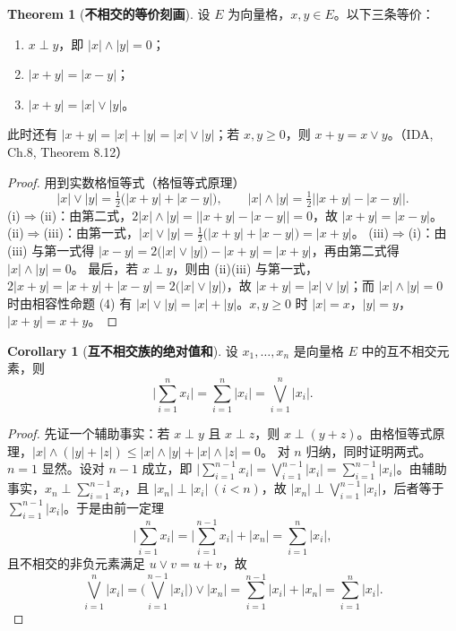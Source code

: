 \documentclass[oneside]{book}
\theoremstyle{definition}
\theoremstyle{definition}
\newtheorem{theorem}{Theorem}[section]
\newtheorem{corollary}{Corollary}[section]
\begin{document}
	\begin{theorem}[\bfseries{不相交的等价刻画}]
		设 $E$ 为向量格，$x,y\in E$。以下三条等价：
		\begin{enumerate}[label=(\roman*),leftmargin=2.2em,itemsep=0.1em,topsep=0.3em]
			\item $x\perp y$，即 $|x|\wedge|y|=0$；
			\item $|x+y|=|x-y|$；
			\item $|x+y|=|x|\vee|y|$。
		\end{enumerate}
		此时还有 $|x+y|=|x|+|y|=|x|\vee|y|$；若 $x,y\geqslant0$，则 $x+y=x\vee y$。（IDA, Ch.8, Theorem 8.12）
	\end{theorem}
	
	\begin{proof}
		用到实数格恒等式（格恒等式原理）
		\[
		|x|\vee|y|=\tfrac12\big(|x+y|+|x-y|\big),\qquad
		|x|\wedge|y|=\tfrac12\big||x+y|-|x-y|\big| .
		\]
		(i)$\Rightarrow$(ii)：由第二式，$2|x|\wedge|y|=\big||x+y|-|x-y|\big|=0$，故 $|x+y|=|x-y|$。
		(ii)$\Rightarrow$(iii)：由第一式，$|x|\vee|y|=\tfrac12\big(|x+y|+|x-y|\big)=|x+y|$。
		(iii)$\Rightarrow$(i)：由 (iii) 与第一式得 $|x-y|=2\big(|x|\vee|y|\big)-|x+y|=|x+y|$，再由第二式得 $|x|\wedge|y|=0$。
		最后，若 $x\perp y$，则由 (ii)(iii) 与第一式，$2|x+y|=|x+y|+|x-y|=2\big(|x|\vee|y|\big)$，故 $|x+y|=|x|\vee|y|$；而 $|x|\wedge|y|=0$ 时由相容性命题 (4) 有 $|x|\vee|y|=|x|+|y|$。$x,y\geqslant0$ 时 $|x|=x$，$|y|=y$，$|x+y|=x+y$。
	\end{proof}
	
	\begin{corollary}[\bfseries{互不相交族的绝对值和}]
		设 $x_{1},\dots,x_{n}$ 是向量格 $E$ 中的互不相交元素，则
		\[
		\Big|\sum_{i=1}^{n}x_{i}\Big|=\sum_{i=1}^{n}|x_{i}|=\bigvee_{i=1}^{n}|x_{i}| .
		\]
	\end{corollary}
	
	\begin{proof}
		先证一个辅助事实：若 $x\perp y$ 且 $x\perp z$，则 $x\perp(y+z)$。由格恒等式原理，$|x|\wedge(|y|+|z|)\leqslant|x|\wedge|y|+|x|\wedge|z|=0$。
		对 $n$ 归纳，同时证明两式。$n=1$ 显然。设对 $n-1$ 成立，即 $\big|\sum_{i=1}^{n-1}x_{i}\big|=\bigvee_{i=1}^{n-1}|x_{i}|=\sum_{i=1}^{n-1}|x_{i}|$。由辅助事实，$x_{n}\perp\sum_{i=1}^{n-1}x_{i}$，且 $|x_{n}|\perp|x_{i}|\ (i<n)$，故 $|x_{n}|\perp\bigvee_{i=1}^{n-1}|x_{i}|$，后者等于 $\sum_{i=1}^{n-1}|x_{i}|$。于是由前一定理
		\[
		\Big|\sum_{i=1}^{n}x_{i}\Big|=\Big|\sum_{i=1}^{n-1}x_{i}\Big|+|x_{n}|=\sum_{i=1}^{n}|x_{i}|,
		\]
		且不相交的非负元素满足 $u\vee v=u+v$，故
		\[
		\bigvee_{i=1}^{n}|x_{i}|=\Big(\bigvee_{i=1}^{n-1}|x_{i}|\Big)\vee|x_{n}|=\sum_{i=1}^{n-1}|x_{i}|+|x_{n}|=\sum_{i=1}^{n}|x_{i}| .
		\]
	\end{proof}
	
\end{document}
